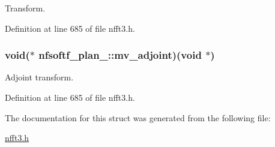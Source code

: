 Transform. 



Definition at line 685 of file nfft3.\-h.

\hypertarget{structnfsoftf__plan___a858269faf194eca2137b65f2a5a8c0fb}{
\subsubsection[{mv\-\_\-adjoint}]{\setlength{\rightskip}{0pt plus 5cm}void($\ast$ nfsoftf\-\_\-plan\-\_\-\-::mv\-\_\-adjoint)(void $\ast$)}}\label{structnfsoftf__plan___a858269faf194eca2137b65f2a5a8c0fb}


Adjoint transform. 



Definition at line 685 of file nfft3.\-h.



The documentation for this struct was generated from the following file\-:\begin{DoxyCompactItemize}
\item 
\hyperlink{nfft3_8h}{nfft3.\-h}\end{DoxyCompactItemize}
